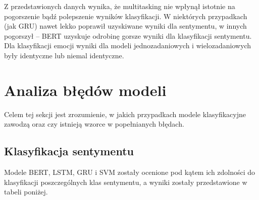 Z przedstawionych danych wynika, że multitasking nie wpłynął istotnie na pogorszenie bądź polepszenie wyników klasyfikacji. W niektórych przypadkach (jak GRU) nawet lekko poprawił uzyskiwane wyniki dla sentymentu, w innych pogorszył -- BERT uzyskuje odrobinę gorsze wyniki dla klasyfikacji sentymentu. Dla klasyfikacji emocji wyniki dla modeli jednozadaniowych i wielozadaniowych były identyczne lub niemal identyczne.

\newpage
\section{Analiza błędów modeli}

Celem tej sekcji jest zrozumienie, w jakich przypadkach modele klasyfikacyjne zawodzą oraz czy istnieją wzorce w popełnianych błędach.

\subsection{Klasyfikacja sentymentu}

Modele BERT, LSTM, GRU i SVM zostały ocenione pod kątem ich zdolności do klasyfikacji poszczególnych klas sentymentu, a wyniki zostały przedstawione w tabeli poniżej.

